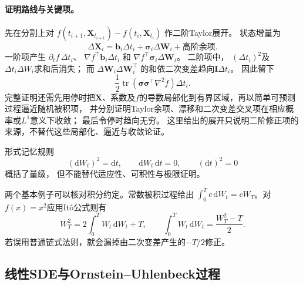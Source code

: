 \paragraph{证明路线与关键项。}
先在分割上对 $f(t_{i+1},\bm{X}_{t_{i+1}}) -f(t_{i},\bm{X}_{t_i})$ 作二阶Taylor展开。
状态增量为
\[
	\Delta\bm{X}_{i}
	=\bm{b}_{i}\Delta t_{i}+\bm{\sigma}_{i}\Delta\bm{W}_{i}+\text{高阶余项}.
\]
一阶项产生 $\partial_{t}f\,\Delta t_{i}$、
$\nabla f^{\top}\bm{b}_{i}\Delta t_{i}$ 和
$\nabla f^{\top}\bm{\sigma}_{i}\Delta\bm{W}_{i}$。 二阶项中， $(\Delta t_{i})^{2}$及
$\Delta t_{i}\Delta W_{i}$求和后消失； 而 $\Delta\bm{W}_{i}\Delta\bm{W}_{i}^{\top}$
的和依二次变差趋向$\bm{I}\Delta t_{i}$。 因此留下
\[
		\frac{1}{2}\operatorname{tr}
		(\bm{\sigma}\bm{\sigma}^{\top}\nabla^{2}f)\Delta t_{i}.
\]
完整证明还需先用停时把$\bm{X}$、系数及$f$的导数局部化到有界区域，再以简单可预测过程逼近随机被积项，
并分别证明Taylor余项、漂移和二次变差交叉项在相应概率或$L^{1}$意义下收敛； 最后令停时趋向无穷。
这里给出的展开只说明二阶修正项的来源，不替代这些局部化、逼近与收敛论证。

形式记忆规则
\[
	(\mathrm{d}W_{t})^{2}=\mathrm{d}t, \qquad \mathrm{d}W_{t}\,\mathrm{d}t=0, \qquad
	(\mathrm{d}t)^{2}=0
\]
概括了量级， 但不能替代适应性、可积性与极限证明。

两个基本例子可以核对积分约定。常数被积过程给出
$\int_0^T c\,\mathrm{d}W_t=cW_T$。对$f(x)=x^2$应用Itô公式则有
\[
	W_T^2=2\int_0^T W_t\,\mathrm{d}W_t+T,
	\qquad
	\int_0^T W_t\,\mathrm{d}W_t=\frac{W_T^2-T}{2}.
\]
若误用普通链式法则，就会漏掉由二次变差产生的$-T/2$修正。

\subsection{线性SDE与Ornstein--Uhlenbeck过程}

